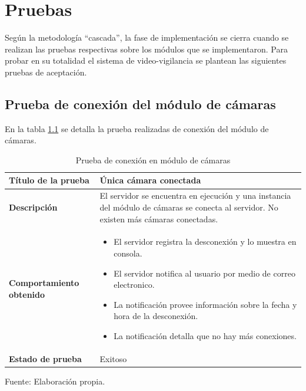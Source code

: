 \chapter{Pruebas}

Según la metodología ``cascada'', la fase de implementación se cierra cuando se realizan las pruebas respectivas sobre los módulos que se implementaron. Para probar en su totalidad el sistema de video-vigilancia se plantean las siguientes pruebas de aceptación.\\

\section{Prueba de conexión del módulo de cámaras}
En la tabla \ref{con_modulo_cameras} se detalla la prueba realizadas de conexión del módulo de cámaras.

\begin{table}[H]
    \caption{Prueba de conexión en módulo de cámaras}
    \label{con_modulo_cameras}
    \begin{center}
        \begin{tabular}{|>{\centering}p{}|m{}<{\centering}|} 
            \hline
            \textbf{Título de la prueba} & \textbf{Única cámara conectada} \\
            \hline
            \textbf{Descripción} & El servidor se encuentra en ejecución y una instancia del módulo de cámaras se conecta al servidor. No existen más cámaras conectadas.\\
            \hline
            \textbf{Comportamiento obtenido} & 
            \begin{itemize}
                \item El servidor registra la desconexión y lo muestra en consola.
                \item El servidor notifica al usuario por medio de correo electronico.
                \item La notificación provee información sobre la fecha y hora de la desconexión.
                \item La notificación detalla que no hay más conexiones.
            \end{itemize} \\ 
            \hline
            \textbf{Estado de prueba} & Exitoso \\
            \hline
        \end{tabular}
        \begin{center}
            Fuente: Elaboración propia.
        \end{center}
    \end{center}
\end{table}

